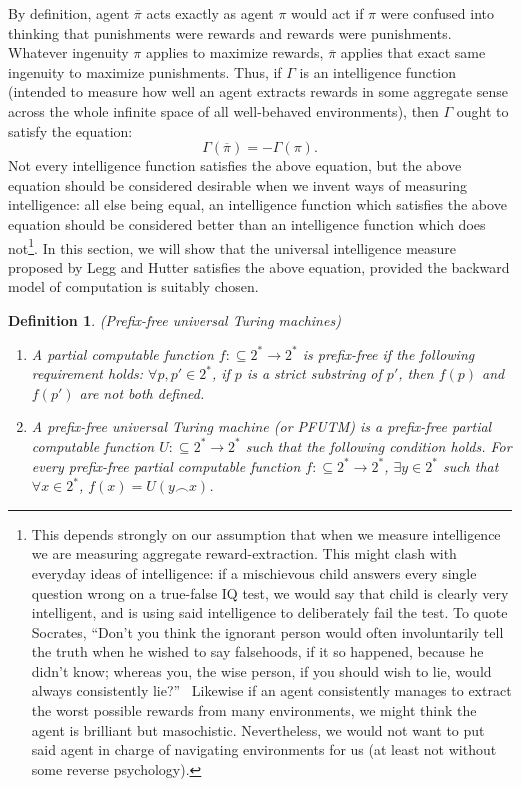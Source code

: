\documentclass{article}
\newtheorem{definition}[theorem]{Definition}
\begin{document}
By definition, agent $\overline\pi$ acts exactly as agent $\pi$ would
act if $\pi$ were confused into thinking that punishments were rewards
and rewards were punishments.
Whatever ingenuity $\pi$ applies to maximize rewards,
$\overline\pi$ applies that exact same ingenuity to maximize punishments.
Thus, if $\Gamma$ is an intelligence function (intended to measure how
well an agent extracts rewards in some aggregate sense across the whole
infinite space of all well-behaved environments), then $\Gamma$ ought
to satisfy the equation:
\[
    \Gamma(\overline\pi) = -\Gamma(\pi).
\]
Not every intelligence function satisfies the above equation, but the
above equation should be considered desirable when we
invent ways of measuring intelligence: all else being equal, an
intelligence function which satisfies the above equation should be
considered better than an intelligence function which does
not\footnote{This depends strongly on our assumption that when we
measure intelligence we are measuring aggregate reward-extraction. This might clash
with everyday ideas of intelligence: if a mischievous child answers every single
question wrong on a true-false IQ test, we would say that child is clearly very
intelligent, and is using said intelligence to deliberately fail the test.
To quote Socrates, ``Don't you think the ignorant person would often involuntarily
tell the truth when he wished to say falsehoods, if it so happened, because he
didn't know; whereas you, the wise person, if you should wish to lie,
would always consistently lie?''\ \cite{lesserhippias}
Likewise if an agent consistently manages to extract the worst possible rewards
from many environments, we might think the agent is brilliant but
masochistic.
Nevertheless, we would not want to put said agent
in charge of navigating environments for us (at least not without some
reverse psychology).}.
In this section, we will show that the universal intelligence measure
proposed by Legg and Hutter satisfies the above equation, provided the
backward model of computation is suitably chosen.

\begin{definition}
    (Prefix-free universal Turing machines)
    \begin{enumerate}
        \item A partial computable function $f:\subseteq 2^*\to 2^*$
        is \emph{prefix-free} if the following requirement holds:
        $\forall p,p'\in 2^*$, if $p$ is a strict substring of $p'$,
        then $f(p)$ and $f(p')$ are not both defined.
        \item A \emph{prefix-free universal Turing machine}
        (or \emph{PFUTM}) is a prefix-free
        partial computable function $U:\subseteq 2^*\to 2^*$
        such that the following condition holds.
        For every prefix-free partial computable function
        $f:\subseteq 2^*\to 2^*$, $\exists y\in 2^*$ such that
        $\forall x\in 2^*$, $f(x)=U(y\frown x)$.
    \end{enumerate}
\end{definition}
\end{document}

